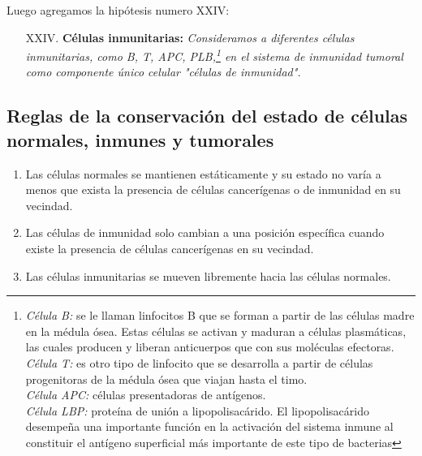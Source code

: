Luego agregamos la hip\'otesis numero XXIV:

\begin{itemize}
	\item [XXIV.] {\textbf{ C\'elulas inmunitarias: }} \emph{Consideramos a diferentes c\'elulas inmunitarias, como B, T, APC, PLB,\footnote{{\it C\'elula B:} se le llaman linfocitos B que se forman a partir de las c\'elulas madre en la m\'edula \'osea. Estas c\'elulas se activan y maduran a c\'elulas plasm\'aticas, las cuales producen y liberan anticuerpos que con sus mol\'eculas efectoras.\\ {\it C\'elula T:} es otro tipo de linfocito que se desarrolla a partir de c\'elulas progenitoras de la m\'edula \'osea que viajan hasta el timo.\\ {\it C\'elula APC:} c\'elulas presentadoras de ant\'igenos.\\ {\it C\'elula LBP:} prote\'ina de uni\'on a lipopolisac\'arido. El lipopolisac\'arido desempe\~na una importante funci\'on en la activaci\'on del sistema inmune al constituir el ant\'igeno superficial m\'as importante de este tipo de bacterias} en el sistema de inmunidad tumoral como componente \'unico celular "c\'elulas de inmunidad".}
\end{itemize}

\subsection{Reglas de la conservaci\'on del estado de c\'elulas normales, inmunes y tumorales}

\begin{enumerate}
	\item Las c\'elulas normales se mantienen est\'aticamente y su estado no var\'ia a menos que exista la presencia de c\'elulas cancer\'igenas o de inmunidad en su vecindad.
	\item Las c\'elulas de inmunidad solo cambian a una posici\'on espec\'ifica cuando existe la presencia de c\'elulas cancer\'igenas en su vecindad.
	\item Las c\'elulas inmunitarias se mueven libremente hacia las c\'elulas normales.
\end{enumerate}

